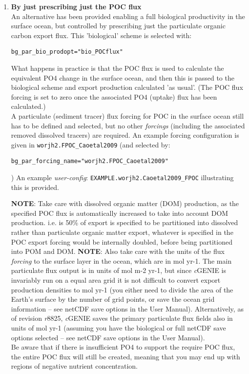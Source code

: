 \documentclass[11pt,fleqn]{book} %
\begin{document}
\begin{enumerate}[noitemsep]
\vspace{1mm}
        \item \textbf{By just prescribing just the POC flux}
                \\An alternative has been provided enabling a full biological productivity in the surface ocean, but controlled by prescribing just the particulate organic carbon export flux. This 'biological' scheme is selected with:
\vspace{-5.1mm}\begin{verbatim}bg_par_bio_prodopt="bio_POCflux"\end{verbatim}\vspace{-5.1mm}
What happens in practice is that the POC flux is used to calculate the equivalent PO4 change in the surface ocean, and then this is passed to the biological scheme and export production calculated 'as usual'. (The POC flux forcing is set to zero once the associated PO4 (uptake) flux has been calculated.)
                \\A particulate (sediment tracer) flux forcing for POC in the surface ocean still has to be defined and selected, but no other \textit{forcings} (including the associated removed dissolved tracers) are required. An example forcing configuration is given in \texttt{worjh2.FPOC\_Caoetal2009} (and selected by:
\vspace{-1mm}\begin{verbatim}bg_par_forcing_name="worjh2.FPOC_Caoetal2009"\end{verbatim}\vspace{-1mm})
An example \textit{user-config}: \texttt{EXAMPLE.worjh2.Caoetal2009\_FPOC} illustrating this is provided.

\noindent \textbf{NOTE}: Take care with dissolved organic matter (DOM) production, as the specified POC flux is automatically increased to take into account DOM production. i.e. is 50\% of export is specified to be partitioned into dissolved rather than particulate organic matter export, whatever is specified in the POC export forcing would be internally doubled, before being partitioned into POM and DOM.
\noindent \textbf{NOTE}: Also take care with the units of the flux \textit{forcing} to the surface layer in the ocean, which are in mol yr-1. The main particulate flux output is in units of mol m-2 yr-1, but since \textit{c}GENIE is invariably run on a equal area grid it is not difficult to convert export production densities to mol yr-1 (you either need to divide the area of the Earth's surface by the number of grid points, or save the ocean grid information -- see netCDF save options in the User Manual). Alternatively, as of revision \textit{r}8825, \textit{c}GENIE saves the primary particulate flux fields also in units of mol yr-1 (assuming you have the biological or full netCDF save options selected -- see netCDF save options in the User Manual).
\\Be aware that if there is insufficient PO4 to support the require POC flux, the entire POC flux will still be created, meaning that you may end up with regions of negative nutrient concentration.

\end{enumerate}
\end{document}
